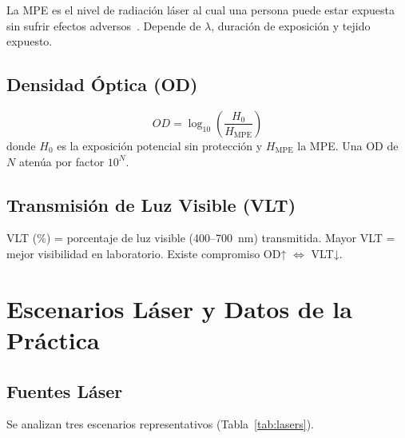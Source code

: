 \documentclass[12pt,a4paper]{article}
\begin{document}
La MPE es el nivel de radiación láser al cual una persona puede estar expuesta
sin sufrir efectos adversos~\cite{iec60825,ansi2014}. Depende de $\lambda$,
duración de exposición y tejido expuesto.

\subsection{Densidad Óptica (OD)}
\label{sec:OD_teoria}

\begin{equation}
	\boxed{OD = \log_{10}\!\left(\frac{H_0}{H_{\mathrm{MPE}}}\right)}
	\label{eq:OD}
\end{equation}
donde $H_0$ es la exposición potencial sin protección y $H_{\mathrm{MPE}}$ la
MPE. Una OD de $N$ atenúa por factor $10^N$.

\subsection{Transmisión de Luz Visible (VLT)}

VLT (\%) = porcentaje de luz visible (400--700~nm) transmitida. Mayor VLT =
mejor visibilidad en laboratorio. Existe compromiso OD↑ $\Leftrightarrow$
VLT↓.

\section{Escenarios Láser y Datos de la Práctica}
\label{sec:escenarios}

\subsection{Fuentes Láser}

Se analizan tres escenarios representativos (Tabla~\ref{tab:lasers}).
\end{document}
